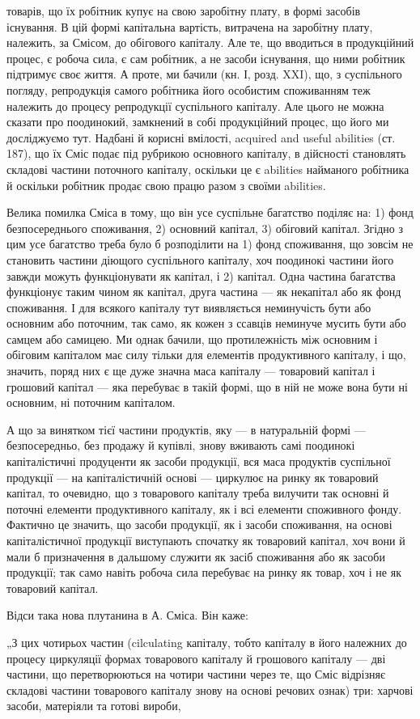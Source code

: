 \parcont{}  %
товарів, що їх робітник купує на свою заробітну плату, в формі засобів
існування. В цій формі капітальна вартість, витрачена на заробітну плату,
належить, за Смісом, до обігового капіталу. Але те, що вводиться в
продукційний процес, є робоча сила, є сам робітник, а не засоби існування,
що ними робітник підтримує своє життя. А проте, ми бачили
(кн. І, розд. XXI), що, з суспільного погляду, репродукція самого робітника
його особистим споживанням теж належить до процесу репродукції
суспільного капіталу. Але цього не можна сказати про поодинокий,
замкнений в собі продукційний процес, що його ми досліджуємо тут.
Надбані й корисні вмілості, acquired and useful abilities (ст. 187), що їх
Сміс подає під рубрикою основного капіталу, в дійсності становлять
складові частини поточного капіталу, оскільки це є abilities найманого
робітника й оскільки робітник продає свою працю разом з своїми abilities.

Велика помилка Сміса в тому, що він усе суспільне багатство поділяє
на: 1) фонд безпосереднього споживання, 2) основний капітал,
3) обіговий капітал. Згідно з цим усе багатство треба було б розподілити
на 1) фонд споживання, що зовсім не становить частини діющого
суспільного капіталу, хоч поодинокі частини його завжди можуть функціонувати
як капітал, і 2) капітал. Одна частина багатства функціонує
таким чином як капітал, друга частина — як некапітал або як фонд
споживання. І для всякого капіталу тут виявляється неминучість бути
або основним або поточним, так само, як кожен з ссавців неминуче мусить
бути або самцем або самицею. Ми однак бачили, що протилежність
між основним і обіговим капіталом має силу тільки для елементів продуктивного
капіталу, і що, значить, поряд них є ще дуже значна
маса капіталу — товаровий капітал і грошовий капітал — яка перебуває в
такій формі, що в ній не може вона бути ні основним, ні поточним
капіталом.

А що за винятком тієї частини продуктів, яку — в натуральній формі —
безпосередньо, без продажу й купівлі, знову вживають самі поодинокі
капіталістичні продуценти як засоби продукції, вся маса продуктів суспільної
продукції — на капіталістичній основі — циркулює на ринку як
товаровий капітал, то очевидно, що з товарового капіталу треба вилучити
так основні й поточні елементи продуктивного капіталу, як і всі
елементи споживного фонду. Фактично це значить, що засоби продукції,
як і засоби споживання, на основі капіталістичної продукції виступають
спочатку як товаровий капітал, хоч вони й мали б призначення в
дальшому служити як засіб споживання або як засоби продукції; так само
навіть робоча сила перебуває на ринку як товар, хоч і не як товаровий
капітал.

Відси така нова плутанина в А. Сміса. Він каже:

„З цих чотирьох частин (cilculating капіталу, тобто капіталу в його
належних до процесу циркуляції формах товарового капіталу й грошового
капіталу — дві частини, що перетворюються на чотири частини через
те, що Сміс відрізняє складові частини товарового капіталу знову на
основі речових ознак) три: харчові засоби, матеріяли та готові вироби,
\parbreak{}  %
